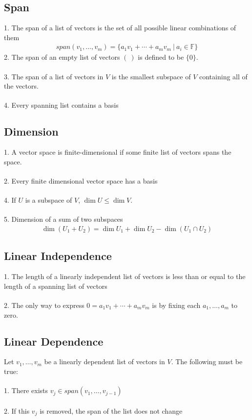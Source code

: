 \documentclass[11pt,reqno]{article}
\newcommand{\F}{\mathbb{F}}
\theoremstyle{definition}
\begin{document}
\subsection*{Span}
1. The span of a list of vectors is the set of all possible linear combinations of them
\begin{align*}
    span(v_1,\ldots,v_m) = \{a_1v_1+\cdots+a_mv_m\ |\ a_i\in\F\}
\end{align*}
2. The span of an empty list of vectors $(\ )$ is defined to be $\{0\}$.\\\\
3. The span of a list of vectors in $V$ is the smallest subspace of $V$ containing all of the vectors.\\\\
4. Every spanning list contains a basis

\subsection*{Dimension}
1. A vector space is finite-dimensional if some finite list of vectors spans the space.\\\\
2. Every finite dimensional vector space has a basis\\\\
4. If $U$ is a subspace of $V$, $\dim U\leq \dim V$.\\\\
5. Dimension of a sum of two subspaces
\begin{align*}
    \dim(U_1 + U_2) = \dim U_1 + \dim U_2 - \dim(U_1 \cap U_2)
\end{align*}

\subsection*{Linear Independence}
1. The length of a linearly independent list of vectors is less than or equal to the length of a spanning list of vectors\\\\
2. The only way to express $0 = a_1v_1+\cdots + a_mv_m$ is by fixing each $a_1,\ldots,a_m$ to zero.

\subsection*{Linear Dependence}
Let $v_1,\ldots,v_m$ be a linearly dependent list of vectors in $V$. The following must be true:\\\\
1. There exists $v_j\in span(v_1,\ldots,v_{j-1})$\\\\
2. If this $v_j$ is removed, the span of the list does not change
\end{document}
